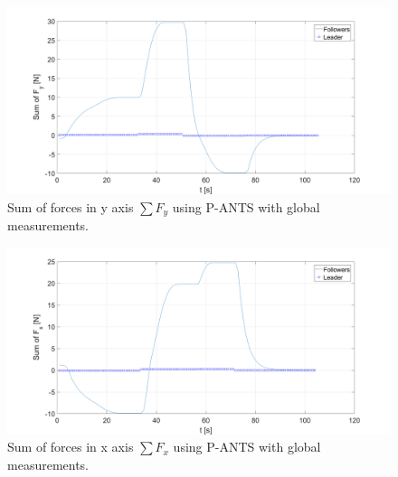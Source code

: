 \documentclass[letterpaper, 10 pt, conference]{ieeeconf}
\begin{document}
\begin{figure}[!h]
\includegraphics[width=.53\textwidth]{figures/P_ANTS_SumFy.png}
	\centering
	\caption{Sum of forces in y axis $\sum F_y$ using P-ANTS with global measurements.}
	\label{fpsfy}
\end{figure}
\begin{figure}[!h]
	\includegraphics[width=.53\textwidth]{figures/P_ANTS_SumFx.png}
	\centering
	\caption{Sum of forces in x axis $\sum F_x$ using P-ANTS with global measurements.}
	\label{fpsfx}
\end{figure}
\end{document}
